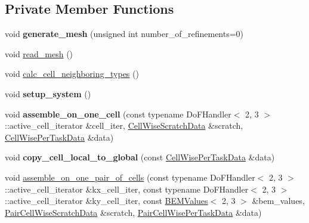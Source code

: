 \subsection*{Private Member Functions}
\begin{DoxyCompactItemize}
\item 
\mbox{\label{classLaplaceBEM_1_1Erichsen1996Efficient_1_1Example2_a4771be3ff7c2e6308e13b3d21756ff1c}} 
void {\bfseries generate\+\_\+mesh} (unsigned int number\+\_\+of\+\_\+refinements=0)
\item 
void \hyperlink{classLaplaceBEM_1_1Erichsen1996Efficient_1_1Example2_a0d5abae56e8da05aad9ade216126109a}{read\+\_\+mesh} ()
\item 
void \hyperlink{classLaplaceBEM_1_1Erichsen1996Efficient_1_1Example2_a6a47dc2d39a4a3ff6b446e43e520bde7}{calc\+\_\+cell\+\_\+neighboring\+\_\+types} ()
\item 
\mbox{\label{classLaplaceBEM_1_1Erichsen1996Efficient_1_1Example2_a7bece202baddc2ff307f19d973f744fa}} 
void {\bfseries setup\+\_\+system} ()
\item 
\mbox{\label{classLaplaceBEM_1_1Erichsen1996Efficient_1_1Example2_a8fd1e4be1faa412424e1ee521c597d37}} 
void {\bfseries assemble\+\_\+on\+\_\+one\+\_\+cell} (const typename Do\+F\+Handler$<$ 2, 3 $>$\+::active\+\_\+cell\+\_\+iterator \&cell\+\_\+iter, \hyperlink{structLaplaceBEM_1_1CellWiseScratchData}{Cell\+Wise\+Scratch\+Data} \&scratch, \hyperlink{structLaplaceBEM_1_1CellWisePerTaskData}{Cell\+Wise\+Per\+Task\+Data} \&data)
\item 
\mbox{\label{classLaplaceBEM_1_1Erichsen1996Efficient_1_1Example2_aafff0bc1b7690a0150ba69991d37ef26}} 
void {\bfseries copy\+\_\+cell\+\_\+local\+\_\+to\+\_\+global} (const \hyperlink{structLaplaceBEM_1_1CellWisePerTaskData}{Cell\+Wise\+Per\+Task\+Data} \&data)
\item 
void \hyperlink{classLaplaceBEM_1_1Erichsen1996Efficient_1_1Example2_afe943d5681aaef439208f51dc463f173}{assemble\+\_\+on\+\_\+one\+\_\+pair\+\_\+of\+\_\+cells} (const typename Do\+F\+Handler$<$ 2, 3 $>$\+::active\+\_\+cell\+\_\+iterator \&kx\+\_\+cell\+\_\+iter, const typename Do\+F\+Handler$<$ 2, 3 $>$\+::active\+\_\+cell\+\_\+iterator \&ky\+\_\+cell\+\_\+iter, const \hyperlink{classLaplaceBEM_1_1BEMValues}{B\+E\+M\+Values}$<$ 2, 3 $>$ \&bem\+\_\+values, \hyperlink{structLaplaceBEM_1_1PairCellWiseScratchData}{Pair\+Cell\+Wise\+Scratch\+Data} \&scratch, \hyperlink{structLaplaceBEM_1_1PairCellWisePerTaskData}{Pair\+Cell\+Wise\+Per\+Task\+Data} \&data)

\end{DoxyCompactItemize}
